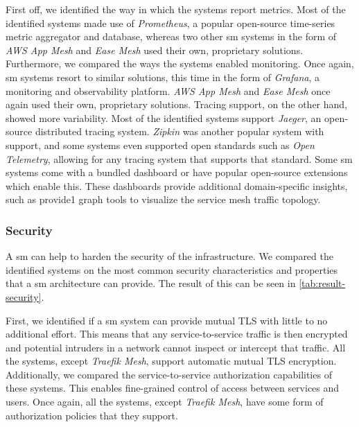 First off, we identified the way in which the systems report metrics. Most of the identified systems made use of \textit{Prometheus}, a popular open-source time-series metric aggregator and database, whereas two other \gls{sm} systems in the form of \textit{AWS App Mesh} and \textit{Ease Mesh} used their own, proprietary solutions. Furthermore, we compared the ways the systems enabled monitoring. Once again, \gls{sm} systems resort to similar solutions, this time in the form of \textit{Grafana}, a monitoring and observability platform. \textit{AWS App Mesh} and \textit{Ease Mesh} once again used their own, proprietary solutions. Tracing support, on the other hand, showed more variability. Most of the identified systems support \textit{Jaeger}, an open-source distributed tracing system. \textit{Zipkin} was another popular system with support, and some systems even supported open standards such as \textit{Open Telemetry}, allowing for any tracing system that supports that standard. Some \gls{sm} systems come with a bundled dashboard or have popular open-source extensions which enable this. These dashboards provide additional domain-specific insights, such as provide1 graph tools to visualize the service mesh traffic topology. 

\subsubsection{Security}
\label{sec:survey:results:comparison:security}



A \gls{sm} can help to harden the security of the infrastructure. We compared the identified systems on the most common security characteristics and properties that a \gls{sm} architecture can provide. The result of this can be seen in \cref{tab:result-security}. 

First, we identified if a \gls{sm} system can provide mutual TLS with little to no additional effort. This means that any service-to-service traffic is then encrypted and potential intruders in a network cannot inspect or intercept that traffic. All the systems, except \textit{Traefik Mesh}, support automatic mutual TLS encryption. Additionally, we compared the service-to-service authorization capabilities of these systems. This enables fine-grained control of access between services and users. Once again, all the systems, except \textit{Traefik Mesh}, have some form of authorization policies that they support.

